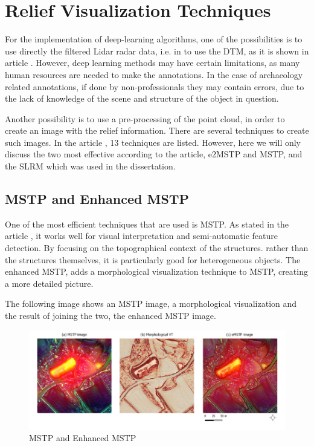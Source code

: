 \section{Relief Visualization Techniques}

For the implementation of deep-learning algorithms, one of the possibilities is to use directly the filtered Lidar radar data, i.e. in to use the DTM, as it is shown in article \cite{deeplearningRawLidarData}. However, deep learning methods may have certain limitations, as many human resources are needed to make the annotations. In the case of archaeology related annotations, if done by non-professionals they may contain errors, due to the lack of knowledge of the scene and structure of the object in question. 

Another possibility is to use a pre-processing of the point cloud, in order to create an image with the relief information. There are several techniques to create such images. In the article \cite{reliefModel}, 13 techniques are listed. However, here we will only discuss the two most effective according to the article, e2MSTP and MSTP, and the SLRM which was used in the dissertation.

\subsection{MSTP and Enhanced MSTP}
One of the most efficient techniques that are used is MSTP. As stated in the article \cite{mstp}, it works well for visual interpretation and semi-automatic feature detection. By focusing on the topographical context of the structures. rather than the structures themselves, it is particularly good for heterogeneous objects. The enhanced MSTP, adds a morphological visualization technique to MSTP, creating a more detailed picture.

The following image shows an MSTP image, a morphological visualization and the result of joining the two, the enhanced MSTP image.

\begin{figure}[H]
\centering
\includegraphics[width=12cm]{figs/mstp.png}
\caption{MSTP and Enhanced MSTP \cite{emstp}}
\end{figure}

